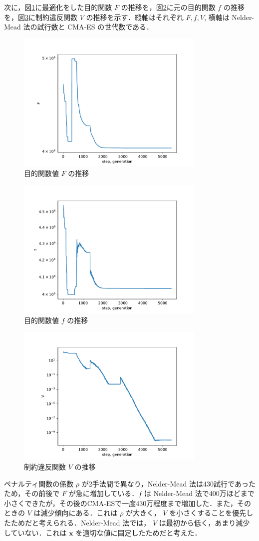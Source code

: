 \documentclass[twocolumn]{jarticle}
\begin{document}
次に，図\ref{img_F}に最適化をした目的関数 $F$ の推移を，図\ref{img_f}に元の目的関数 $f$ の推移を，図\ref{img_V}に制約違反関数 $V$ の推移を示す．縦軸はそれぞれ $F, f, V$, 横軸は Nelder-Mead 法の試行数と CMA-ES の世代数である．
\begin{figure}
    \centering
    \includegraphics[width=9cm]{img_F.pdf}
    \caption{目的関数値 $F$ の推移}
    \label{img_F}
\end{figure}
\begin{figure}
    \centering
    \includegraphics[width=9cm]{img_f.pdf}
    \caption{目的関数値 $f$ の推移}
    \label{img_f}
\end{figure}
\begin{figure}
    \centering
    \includegraphics[width=9cm]{img_V.pdf}
    \caption{制約違反関数 $V$ の推移}
    \label{img_V}
\end{figure}
ペナルティ関数の係数 $\rho$ が2手法間で異なり，Nelder-Mead 法は430試行であったため，その前後で $F$ が急に増加している．$f$ は Nelder-Mead 法で400万ほどまで小さくできたが，その後のCMA-ESで一度430万程度まで増加した．また，そのときの $V$ は減少傾向にある．これは  $\rho$ が大きく， $V$ を小さくすることを優先したためだと考えられる．Nelder-Mead 法では， $V$ は最初から低く，あまり減少していない．これは $\bm{x}$ を適切な値に固定したためだと考えた．
\end{document}
